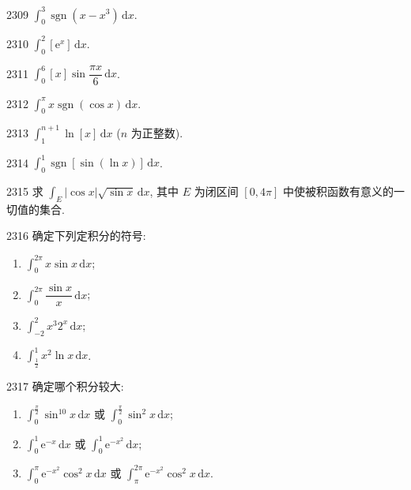 
\begin{prob}[S]{2309}
$\int_{0}^{3} \operatorname{sgn}(x - x^3)\,\mathrm{d}x$.
\end{prob}

\begin{prob}[S]{2310}
$\int_{0}^{2} [\mathrm{e}^x]\,\mathrm{d}x$.
\end{prob}

\begin{prob}[S]{2311}
$\int_{0}^{6} [x]\sin\dfrac{\pi x}{6}\,\mathrm{d}x$.
\end{prob}

\begin{prob}[S]{2312}
$\int_{0}^{\pi} x\operatorname{sgn}(\cos x)\,\mathrm{d}x$.
\end{prob}

\begin{prob}[S]{2313}
$\int_{1}^{n+1} \ln[x]\,\mathrm{d}x$ ($n$ 为正整数).
\end{prob}

\begin{prob}[S]{2314}
$\int_{0}^{1} \operatorname{sgn}[\sin(\ln x)]\,\mathrm{d}x$.
\end{prob}

\begin{prob}[M]{2315}
求 $\int_{E} |\cos x|\sqrt{\sin x}\,\mathrm{d}x$, 其中 $E$ 为闭区间 $[0, 4\pi]$ 中使被积函数有意义的一切值的集合.
\end{prob}


\begin{prob}[L]{2316}
确定下列定积分的符号:
\begin{enumerate}[label=(\alph*), itemsep=2pt, topsep=3pt]
  \item $\int_{0}^{2\pi} x\sin x\,\mathrm{d}x$;
  \item $\int_{0}^{2\pi} \dfrac{\sin x}{x}\,\mathrm{d}x$;
  \item $\int_{-2}^{2} x^3 2^x\,\mathrm{d}x$;
  \item $\int_{\frac{1}{2}}^{1} x^2 \ln x\,\mathrm{d}x$.
\end{enumerate}
\end{prob}

\begin{prob}[L]{2317}
确定哪个积分较大:
\begin{enumerate}[label=(\alph*), itemsep=2pt, topsep=3pt]
  \item $\int_{0}^{\frac{\pi}{2}} \sin^{10} x\,\mathrm{d}x$ 或 $\int_{0}^{\frac{\pi}{2}} \sin^2 x\,\mathrm{d}x$;
  \item $\int_{0}^{1} \mathrm{e}^{-x}\,\mathrm{d}x$ 或 $\int_{0}^{1} \mathrm{e}^{-x^2}\,\mathrm{d}x$;
  \item $\int_{0}^{\pi} \mathrm{e}^{-x^2}\cos^2 x\,\mathrm{d}x$ 或 $\int_{\pi}^{2\pi} \mathrm{e}^{-x^2}\cos^2 x\,\mathrm{d}x$.
\end{enumerate}
\end{prob}


